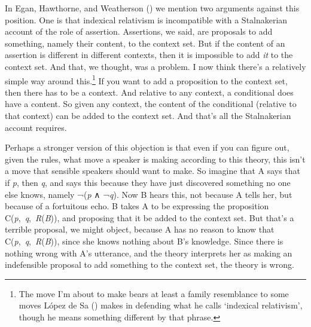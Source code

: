 \documentclass[
  10pt,
  letterpaper,
  DIV=11,
  numbers=noendperiod,
  twoside]{scrartcl}
\begin{document}
In Egan, Hawthorne, and Weatherson
() we mention two arguments against
this position. One is that indexical relativism is incompatible with a
Stalnakerian account of the role of assertion. Assertions, we said, are
proposals to add something, namely their content, to the context set.
But if the content of an assertion is different in different contexts,
then it is impossible to add \emph{it} to the context set. And that, we
thought, was a problem. I now think there's a relatively simple way
around this.\footnote{The move I'm about to make bears at least a family
  resemblance to some moves López de Sa
  () makes in defending what he calls
  `indexical relativism', though he means something different by that
  phrase.} If you want to add a proposition to the context set, then
there has to be a context. And relative to any context, a conditional
does have a content. So given any context, the content of the
conditional (relative to that context) can be added to the context set.
And that's all the Stalnakerian account requires.

Perhaps a stronger version of this objection is that even if you can
figure out, given the rules, what move a speaker is making according to
this theory, this isn't a move that sensible speakers should want to
make. So imagine that A says that if \emph{p}, then \emph{q}, and says
this because they have just discovered something no one else knows,
namely ¬(\emph{p} ∧ ¬\emph{q}). Now B hears this, not because A tells
her, but because of a fortuitous echo. B takes A to be expressing the
proposition C(\emph{p},~\emph{q},~\emph{R}(\emph{B})), and proposing
that it be added to the context set. But that's a terrible proposal, we
might object, because A has no reason to know that
C(\emph{p},~\emph{q},~\emph{R}(\emph{B})), since she knows nothing about
B's knowledge. Since there is nothing wrong with A's utterance, and the
theory interprets her as making an indefensible proposal to add
something to the context set, the theory is wrong.
\end{document}
